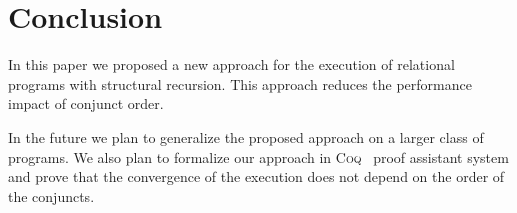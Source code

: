 \section{Conclusion}

In this paper we proposed a new approach for the execution of relational programs with structural recursion. This approach reduces the performance impact of conjunct order.

In the future we plan to generalize the proposed approach on a larger class of programs. We also plan to formalize our approach in \textsc{Coq}~\cite{fair:Coq} proof assistant
system and prove that the convergence of the execution does not depend on the order of the conjuncts.
